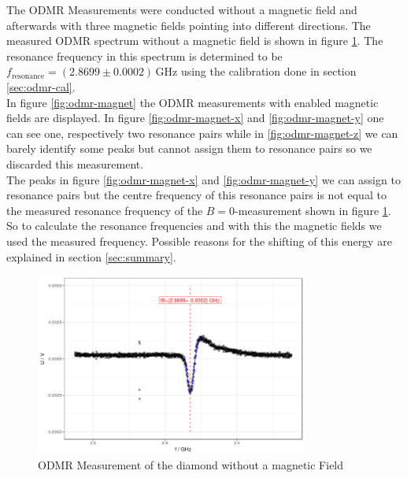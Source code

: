 The ODMR Measurements were conducted without a magnetic field and afterwards with three magnetic fields pointing into different directions. The measured ODMR spectrum without a magnetic field is shown in figure \ref{fig:odmr-no-B}. The resonance frequency in this spectrum is determined to be $f_\text{resonance}=(2.8699\pm0.0002)\,\mathrm{GHz}$ using the calibration done in section \ref{sec:odmr-cal}.\\

In figure \ref{fig:odmr-magnet} the ODMR measurements with enabled magnetic fields are displayed. In figure \ref{fig:odmr-magnet-x} and \ref{fig:odmr-magnet-y} one can see one, respectively two resonance pairs while in \ref{fig:odmr-magnet-z} we can barely identify some peaks but cannot assign them to resonance pairs so we discarded this measurement.\\

The peaks in figure \ref{fig:odmr-magnet-x} and \ref{fig:odmr-magnet-y} we can assign to resonance pairs but the centre frequency of this resonance pairs is not equal to the measured resonance frequency of the $B=0$-measurement shown in figure \ref{fig:odmr-no-B}. So to calculate the resonance frequencies and with this the magnetic fields we used the measured frequency. Possible reasons for the shifting of this energy are explained in section \ref{sec:summary}.

\begin{figure}
	\centering
	\includegraphics[width=0.8\textwidth]{../figures/odmr-1.png}
	\caption{ODMR Measurement of the diamond without a magnetic Field}
	\label{fig:odmr-no-B}
\end{figure}


